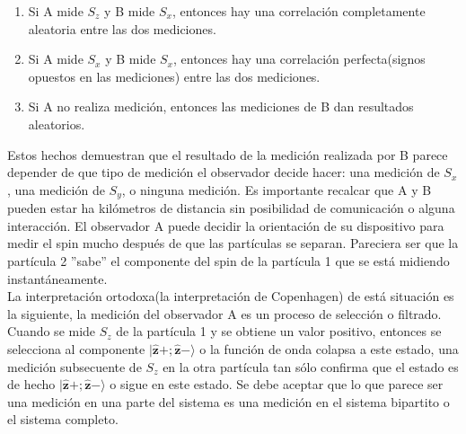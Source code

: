 \documentclass[a4paper]{article}
\begin{document}
\begin{enumerate}
\item Si A mide $S_z$ y B mide $S_x$, entonces hay una correlación completamente aleatoria entre las dos mediciones. 
\item Si A mide $S_x$ y B mide $S_x$, entonces hay una correlación perfecta(signos opuestos en las mediciones) entre las dos mediciones.
\item Si A no realiza medición, entonces las mediciones de B dan resultados aleatorios.
\end{enumerate}
Estos hechos demuestran que el resultado de la medición realizada por B parece depender de que tipo de medición el observador decide hacer: una medición de $S_x$, una medición de $S_y$, o ninguna medición. Es importante recalcar que A y B pueden estar ha kilómetros de distancia sin posibilidad de comunicación o alguna interacción. El observador A puede decidir la orientación de su dispositivo para medir el spin mucho después de que las partículas se separan. Pareciera ser que la partícula 2 ''sabe'' el componente del spin de la partícula 1 que se está midiendo instantáneamente. \\
La interpretación ortodoxa(la interpretación de Copenhagen) de está situación es la siguiente, la medición del observador A es un proceso de selección o filtrado. Cuando se mide $S_z$ de la partícula 1 y se obtiene un valor positivo, entonces se selecciona al componente $|\mathbf{\hat{z}}+;\mathbf{\hat{z}}-\rangle$ o la función de onda colapsa a este estado, una medición subsecuente de $S_z$ en la otra partícula tan sólo confirma que el estado es de hecho $|\mathbf{\hat{z}}+;\mathbf{\hat{z}}-\rangle$ o sigue en este estado. Se debe aceptar que lo que parece ser una medición en una parte del sistema es una medición en el sistema bipartito o el sistema completo.
\end{document}

